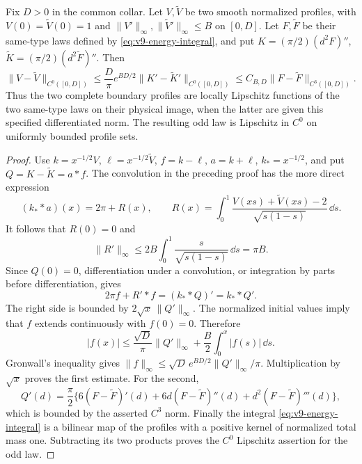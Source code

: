 \begin{theorem}
\label{thm:v9-profile-stability}
Fix $D>0$ in the common collar. Let $V,\widetilde V$ be two smooth
normalized profiles, with $V(0)=\widetilde V(0)=1$ and
$\|V'\|_\infty,\|\widetilde V'\|_\infty\le B$ on $[0,D]$.
Let $F,\widetilde F$ be their same-type laws defined by
\eqref{eq:v9-energy-integral}, and put
$K=(\pi/2)(d^2F)''$, $\widetilde K=(\pi/2)(d^2\widetilde F)''$.
Then
\begin{equation}\label{eq:v9-profile-stability}
 \|V-\widetilde V\|_{C^0([0,D])}
 \le \frac D\pi e^{BD/2}\|K'-\widetilde K'\|_{C^0([0,D])}
 \le C_{B,D}\|F-\widetilde F\|_{C^3([0,D])}.
\end{equation}
Thus the two complete boundary profiles are locally Lipschitz
functions of the two same-type laws on their physical image, when
the latter are given this specified differentiated norm. The resulting
odd law is Lipschitz in $C^0$ on uniformly bounded profile sets.
\end{theorem}
\begin{proof}
Use $k=x^{-1/2}V$, $\ell=x^{-1/2}\widetilde V$,
$f=k-\ell$, $a=k+\ell$, $k_*=x^{-1/2}$, and put
$Q=K-\widetilde K=a*f$. The convolution in the preceding proof
has the more direct expression
\[
 (k_* * a)(x)=2\pi+R(x),\qquad
 R(x)=\int_0^1\frac{V(xs)+\widetilde V(xs)-2}{\sqrt{s(1-s)}}
                                                        \,\dd s.
\]
It follows that $R(0)=0$ and
\[
 \|R'\|_\infty\le
  2B\int_0^1\frac{s}{\sqrt{s(1-s)}}\,\dd s=\pi B.
\]
Since $Q(0)=0$, differentiation under a convolution, or integration
by parts before differentiation, gives
\[
 2\pi f+R'*f=(k_* * Q)'=k_* * Q'.
\]
The right side is bounded by $2\sqrt{x}\,\|Q'\|_\infty$.
The normalized initial values imply that $f$ extends continuously
with $f(0)=0$. Therefore
\[
 |f(x)|\le\frac{\sqrt D}{\pi}\|Q'\|_\infty
                          +\frac B2\int_0^x|f(s)|\,\dd s.
\]
Gronwall's inequality gives
$\|f\|_\infty\le\sqrt D\,e^{BD/2}\|Q'\|_\infty/\pi$.
Multiplication by $\sqrt x$ proves the first estimate. For the second,
\[
 Q'(d)=\frac\pi2\{6(F-\widetilde F)'(d)
       +6d(F-\widetilde F)''(d)+d^2(F-\widetilde F)'''(d)\},
\]
which is bounded by the asserted $C^3$ norm. Finally the integral
\eqref{eq:v9-energy-integral} is a bilinear map of the profiles with
a positive kernel of normalized total mass one. Subtracting its two
products proves the $C^0$ Lipschitz assertion for the odd law.
\end{proof}

